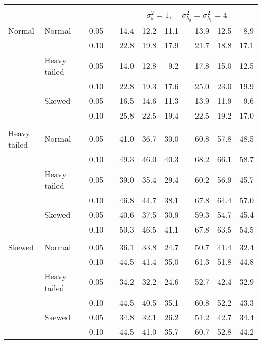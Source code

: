 \begin{table}[ht]
\begin{scriptsize}
\begin{tabular}{ll p{.1cm} c p{.1cm} rrr p{.1cm} rrr}
&&&&&&&&&&&\\
& && && \multicolumn{7}{c}{$\sigma_{\varepsilon}^2 = 1$, \ \ $\sigma_{b_0}^2 = \sigma_{b_1}^2 = 4$} \\ \cline{6-12}
 \rowcolor{gray!20} Normal & Normal &  & 0.05 &  & 14.4 & 12.2 & 11.1 &  & 13.9 & 12.5 & 8.9 \\ 
 \rowcolor{gray!20}    &  &  & 0.10 &  & 22.8 & 19.8 & 17.9 &  & 21.7 & 18.8 & 17.1 \\ 
 \rowcolor{gray!20}    & Heavy tailed &  & 0.05 &  & 14.0 & 12.8 & 9.2 &  & 17.8 & 15.0 & 12.5 \\ 
 \rowcolor{gray!20}    &  &  & 0.10 &  & 22.8 & 19.3 & 17.6 &  & 25.0 & 23.0 & 19.9 \\ 
 \rowcolor{gray!20}    & Skewed &  & 0.05 &  & 16.5 & 14.6 & 11.3 &  & 13.9 & 11.9 & 9.6 \\ 
 \rowcolor{gray!20}    &  &  & 0.10 &  & 25.8 & 22.5 & 19.4 &  & 22.5 & 19.2 & 17.0 \\ 
 &&&&&&&&&&&\\ 
  Heavy tailed & Normal &  & 0.05 &  & 41.0 & 36.7 & 30.0 &  & 60.8 & 57.8 & 48.5 \\ 
   &  &  & 0.10 &  & 49.3 & 46.0 & 40.3 &  & 68.2 & 66.1 & 58.7 \\ 
   & Heavy tailed &  & 0.05 &  & 39.0 & 35.4 & 29.4 &  & 60.2 & 56.9 & 45.7 \\ 
   &  &  & 0.10 &  & 46.8 & 44.7 & 38.1 &  & 67.8 & 64.4 & 57.0 \\ 
   & Skewed &  & 0.05 &  & 40.6 & 37.5 & 30.9 &  & 59.3 & 54.7 & 45.4 \\ 
   &  &  & 0.10 &  & 50.3 & 46.5 & 41.1 &  & 67.8 & 63.5 & 54.5 \\ 
 &&&&&&&&&&&\\ 
  Skewed & Normal &  & 0.05 &  & 36.1 & 33.8 & 24.7 &  & 50.7 & 41.4 & 32.4 \\ 
   &  &  & 0.10 &  & 44.5 & 41.4 & 35.0 &  & 61.3 & 51.8 & 44.8 \\ 
   & Heavy tailed &  & 0.05 &  & 34.2 & 32.2 & 24.6 &  & 52.7 & 42.4 & 32.9 \\ 
   &  &  & 0.10 &  & 44.5 & 40.5 & 35.1 &  & 60.8 & 52.2 & 43.3 \\ 
   & Skewed &  & 0.05 &  & 34.8 & 32.1 & 26.2 &  & 51.2 & 42.7 & 34.4 \\ 
   &  &  & 0.10 &  & 44.5 & 41.0 & 35.7 &  & 60.7 & 52.8 & 44.2 \\ 


\hline
\end{tabular}
\end{scriptsize}
\end{table}


